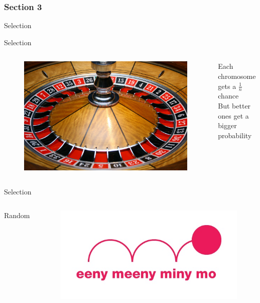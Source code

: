 \documentclass[24pt]{beamer}
\begin{document}
    \begin{centering}
        \begin{frame}[c]{}
            \frametitle{Section 3}
            Selection
        \end{frame}
    \end{centering}

    \begin{frame}{Selection}
        \begin{columns}
                \begin{figure}
                \includegraphics[scale=0.25]{roulette}
                \end{figure}
                Each chromosome gets a $ \frac{1}{n} $ chance\\
                But better ones get a bigger probability
        \end{columns}
    \end{frame}

    \begin{frame}{Selection}
        \begin{columns}
                Random
                \begin{figure}
                \includegraphics[scale=0.4]{random}
                \end{figure}
        \end{columns}
    \end{frame}
\end{document}
